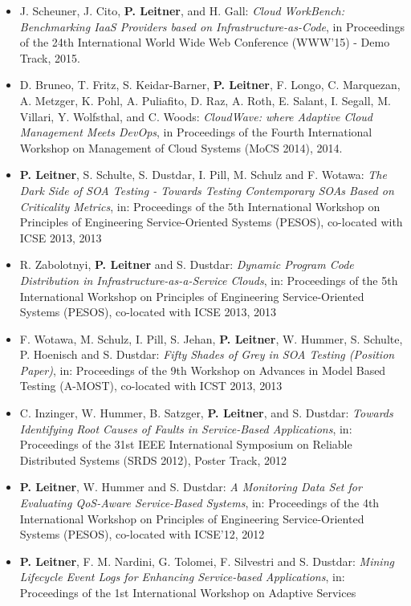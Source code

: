 \documentclass[paper=letter,fontsize=11pt]{scrartcl} %
\begin{document}
\begin{itemize}
  \item J. Scheuner, J. Cito, \textbf{P. Leitner}, and H. Gall: \emph{Cloud WorkBench: Benchmarking IaaS Providers based on Infrastructure-as-Code}, in Proceedings of the 24th International World Wide Web Conference (WWW'15) - Demo Track, 2015.
 \item D. Bruneo, T. Fritz, S. Keidar-Barner, \textbf{P. Leitner}, F. Longo, C. Marquezan, A. Metzger, K. Pohl, A. Puliafito, D. Raz, A. Roth, E. Salant, I. Segall, M. Villari, Y. Wolfsthal, and C. Woods: \emph{CloudWave: where Adaptive Cloud Management Meets DevOps}, in Proceedings of the Fourth International Workshop on Management of Cloud Systems (MoCS 2014), 2014.
 \item \textbf{P. Leitner}, S. Schulte, S. Dustdar, I. Pill, M. Schulz and F. Wotawa: \emph{The Dark Side of SOA Testing - Towards Testing Contemporary SOAs Based on Criticality Metrics}, in: Proceedings of the 5th International Workshop on Principles of Engineering Service-Oriented Systems (PESOS), co-located with ICSE 2013, 2013
\item R. Zabolotnyi, \textbf{P. Leitner} and S. Dustdar: \emph{Dynamic Program Code Distribution in Infrastructure-as-a-Service Clouds}, in: Proceedings of the 5th International Workshop on Principles of Engineering Service-Oriented Systems (PESOS), co-located with ICSE 2013, 2013
\item F. Wotawa, M. Schulz, I. Pill, S. Jehan, \textbf{P. Leitner}, W. Hummer, S. Schulte, P. Hoenisch and S. Dustdar: \emph{Fifty Shades of Grey in SOA Testing (Position Paper)}, in: Proceedings of the 9th Workshop on Advances in Model Based Testing (A-MOST), co-located with ICST 2013, 2013
\item C. Inzinger, W. Hummer, B. Satzger, \textbf{P. Leitner}, and S. Dustdar:
\emph{Towards Identifying Root Causes of Faults in Service-Based Applications}, in: Proceedings of the 31st IEEE International Symposium on Reliable Distributed Systems (SRDS 2012), Poster Track, 2012
\item \textbf{P. Leitner}, W. Hummer and S. Dustdar:
\emph{A Monitoring Data Set for Evaluating QoS-Aware Service-Based Systems}, in: Proceedings of the 4th International Workshop on Principles of Engineering Service-Oriented Systems (PESOS), co-located with ICSE'12, 2012
\item \textbf{P. Leitner}, F. M. Nardini, G. Tolomei, F. Silvestri
and S. Dustdar: \emph{Mining Lifecycle Event Logs for Enhancing
Service-based Applications}, in: Proceedings of the 1st International Workshop on Adaptive Services

\end{itemize}
\end{document}
